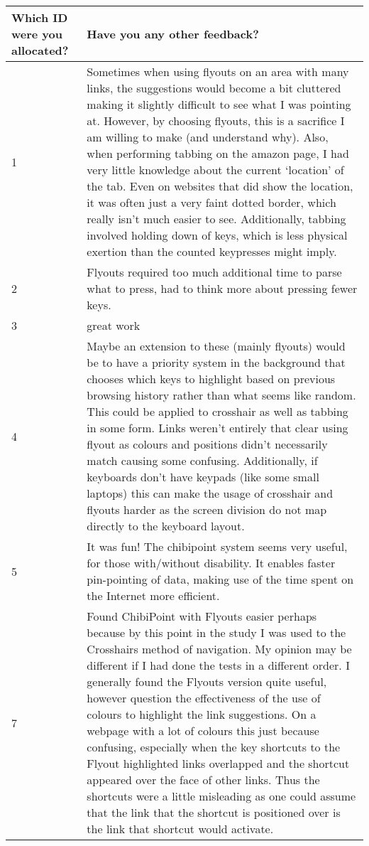 \renewcommand*{\arraystretch}{1.5}
\begin{longtable}{p{1cm}|p{6in}}
\hline\hline
Which ID were you allocated?	&	Have you any other feedback?	\\ [0.5ex]
\hline
\endhead %
1	&	Sometimes when using flyouts on an area with many links, the suggestions would become a bit cluttered making it slightly difficult to see what I was pointing at. However, by choosing flyouts, this is a sacrifice I am willing to make (and understand why).\newline
Also, when performing tabbing on the amazon page, I had very little knowledge about the current `location' of the tab. Even on websites that did show the location, it was often just a very faint dotted border, which really isn't much easier to see.\newline
Additionally, tabbing involved holding down of keys, which is less physical exertion than the counted keypresses might imply.	\\
2	&	Flyouts required too much additional time to parse what to press, had to think more about pressing fewer keys.	\\
3	&	great work	\\
4	&	Maybe an extension to these (mainly flyouts) would be to have a priority system in the background that chooses which keys to highlight based on previous browsing history rather than what seems like random. This could be applied to crosshair as well as tabbing in some form.\newline
Links weren't entirely that clear using flyout as colours and positions didn't necessarily match causing some confusing.\newline
Additionally, if keyboards don't have keypads (like some small laptops) this can make the usage of crosshair and flyouts harder as the screen division do not map directly to the keyboard layout.	\\
5	&	It was fun! The chibipoint system seems very useful, for those with/without disability. It enables faster pin-pointing of data, making use of the time spent on the Internet more efficient.	\\
7	&	Found ChibiPoint with Flyouts easier perhaps because by this  point in the study I was used to the Crosshairs method of navigation. My opinion may be different if I had done the tests in a different order.\newline
I generally found the Flyouts version quite useful, however question the effectiveness of the use of colours to highlight the link suggestions. On a webpage with a lot of colours this just because confusing, especially when the key shortcuts to the Flyout highlighted links overlapped and the shortcut appeared over the face of other links. Thus the shortcuts were a little misleading as one could assume that the link that the shortcut is positioned over is the link that shortcut would activate.\newline

\end{longtable}
